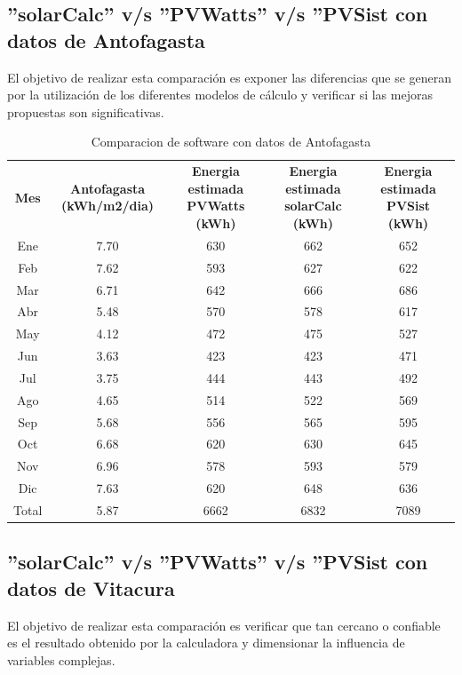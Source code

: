 \subsection{''solarCalc'' v/s ''PVWatts'' v/s ''PVSist con datos de Antofagasta}
El objetivo de realizar esta comparación es exponer las diferencias que se generan por la utilización de los diferentes modelos de cálculo y verificar si las mejoras propuestas son significativas.

\begin{table}[h!]
\caption{Comparacion de software con datos de Antofagasta}
\begin{tabular}{|c|c|c|c|c|}
        \hline
	\textbf{Mes}&\textbf{Antofagasta (kWh/m2/dia)}&\textbf{Energia estimada PVWatts (kWh)}&\textbf{Energia estimada solarCalc (kWh)}&\textbf{Energia estimada PVSist (kWh)}\\
	Ene&	7.70&	630&	662&	652\\
        \hline
	Feb&	7.62&	593&	627&	622\\
        \hline
	Mar&	6.71&	642&	666&	686\\
        \hline
	Abr&	5.48&	570&	578&	617\\
        \hline
	May&	4.12&	472&	475&	527\\
        \hline
	Jun&	3.63&	423&	423&	471\\
        \hline
	Jul&	3.75&	444&	443&	492\\
        \hline
	Ago&	4.65&	514&	522&	569\\
        \hline
	Sep&	5.68&	556&	565&	595\\
        \hline
	Oct&	6.68&	620&	630&	645\\
        \hline
	Nov&	6.96&	578&	593&	579\\
        \hline
	Dic&	7.63&	620&	648&	636\\
        \hline
	Total&5.87&	6662&	6832&	7089\\
        \hline
\end{tabular}
\end{table}

\subsection{''solarCalc'' v/s ''PVWatts'' v/s ''PVSist con datos de Vitacura}
El objetivo de realizar esta comparación es verificar que tan cercano o confiable es el resultado obtenido por la calculadora y dimensionar la influencia de variables complejas.

